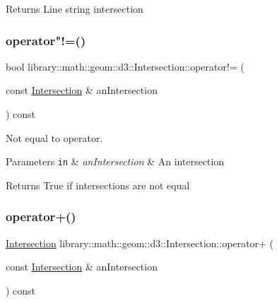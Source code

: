 \begin{DoxyReturn}{Returns}
Line string intersection 
\end{DoxyReturn}
\mbox{\label{classlibrary_1_1math_1_1geom_1_1d3_1_1_intersection_a8e3e47ed63f5c539cc39625b512c4b9e}} 
\subsubsection{\texorpdfstring{operator"!=()}{operator!=()}}
{\footnotesize\ttfamily bool library\+::math\+::geom\+::d3\+::\+Intersection\+::operator!= (\begin{DoxyParamCaption}\item[{const \hyperlink{classlibrary_1_1math_1_1geom_1_1d3_1_1_intersection}{Intersection} \&}]{an\+Intersection }\end{DoxyParamCaption}) const}



Not equal to operator. 


\begin{DoxyParams}[1]{Parameters}
\mbox{\tt in}  & {\em an\+Intersection} & An intersection \\
\hline
\end{DoxyParams}
\begin{DoxyReturn}{Returns}
True if intersections are not equal 
\end{DoxyReturn}
\mbox{\label{classlibrary_1_1math_1_1geom_1_1d3_1_1_intersection_a2b71d1b2a6429a893a8737a4d02c2da6}} 
\subsubsection{\texorpdfstring{operator+()}{operator+()}}
{\footnotesize\ttfamily \hyperlink{classlibrary_1_1math_1_1geom_1_1d3_1_1_intersection}{Intersection} library\+::math\+::geom\+::d3\+::\+Intersection\+::operator+ (\begin{DoxyParamCaption}\item[{const \hyperlink{classlibrary_1_1math_1_1geom_1_1d3_1_1_intersection}{Intersection} \&}]{an\+Intersection }\end{DoxyParamCaption}) const}




